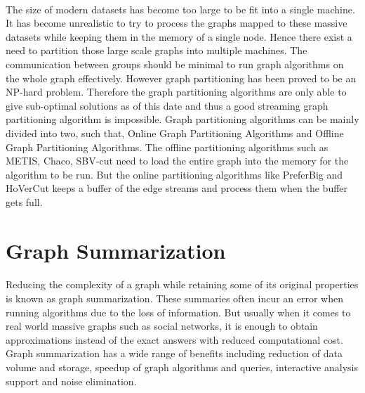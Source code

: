\paragraph{}
The size of modern datasets has become too large to be fit into a single machine. It has become unrealistic to try to process the graphs mapped to these massive datasets while keeping them in the memory of a single node. Hence there exist a need to partition those large scale graphs into multiple machines. The communication between groups should be minimal to run graph algorithms on the whole graph effectively. However graph partitioning has been proved to be an NP-hard problem\cite{garey_simplified_1974}. Therefore the graph partitioning algorithms are only able to give sub-optimal solutions as of this date and thus a good streaming graph partitioning algorithm is impossible\cite{stanton_streaming_2012}. Graph partitioning algorithms can be mainly divided into two, such that, Online Graph Partitioning Algorithms and Offline Graph Partitioning Algorithms. The offline partitioning algorithms such as METIS\cite{karypis_fast_1998}, Chaco\cite{hendrickson_chaco_1993}, SBV-cut\cite{kim_sbv-cut:_2012} need to load the entire graph into the memory for the algorithm to be run. But the online partitioning algorithms like PreferBig\cite{stanton_streaming_2012} and HoVerCut\cite{sajjad_boosting_2016} keeps a buffer of the edge streams and process them when the buffer gets full. 

\section{Graph Summarization}

\paragraph{}
Reducing the complexity of a graph while retaining some of its original properties is known as graph summarization. These summaries often incur an error when running algorithms due to the loss of information. But usually when it comes to real world massive graphs such as social networks, it is enough to obtain approximations instead of the exact answers with reduced computational cost. Graph summarization has a wide range of benefits including reduction of data volume and storage, speedup of graph algorithms and queries, interactive analysis support and noise elimination\cite{liu_graph_2018}.  


